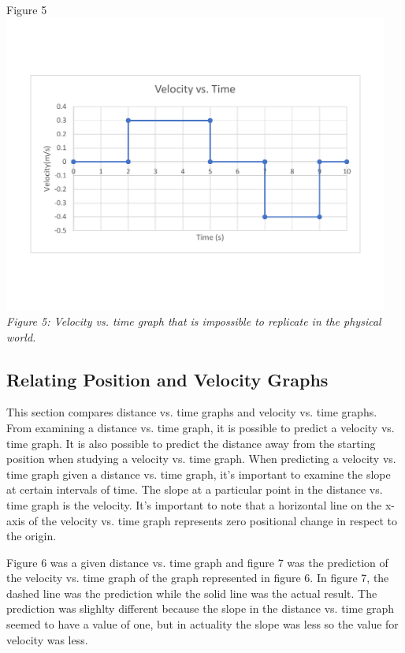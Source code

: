 \documentclass[aps,letterpaper,11pt]{revtex4}
\begin{document}
\begin{center}
\vspace{10mm}
Figure 5\\
\vspace{-10mm}
\includegraphics[width=5in]{ImpossibleVelocityVsTimeGraph.pdf}\\
\vspace{-10mm}
\textit{Figure 5: Velocity vs. time graph that is impossible to replicate in the physical world.}
\end{center}

\newpage 

\subsection{Relating Position and Velocity Graphs}

This section compares distance vs. time graphs and velocity vs. time graphs. From examining a distance vs. time graph, it is possible to predict a velocity vs. time graph. It is also possible to predict the distance away from the starting position when studying a velocity vs. time graph. When predicting a velocity vs. time graph given a distance vs. time graph, it's important to examine the slope at certain intervals of time. The slope at a particular point in the distance vs. time graph is the velocity. It's important to note that a horizontal line on the x-axis of the velocity vs. time graph represents zero positional change in respect to the origin. 

Figure 6 was a given distance vs. time graph and figure 7 was the prediction of the velocity vs. time graph of the graph represented in figure 6. In figure 7, the dashed line was the prediction while the solid line was the actual result. The prediction was slighlty different because the slope in the distance vs. time graph seemed to have a value of one, but in actuality the slope was less so the value for velocity was less. 
\end{document}
